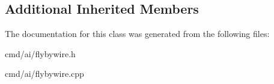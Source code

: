 \subsection*{Additional Inherited Members}


The documentation for this class was generated from the following files\+:\begin{DoxyCompactItemize}
\item 
cmd/ai/flybywire.\+h\item 
cmd/ai/flybywire.\+cpp\end{DoxyCompactItemize}
